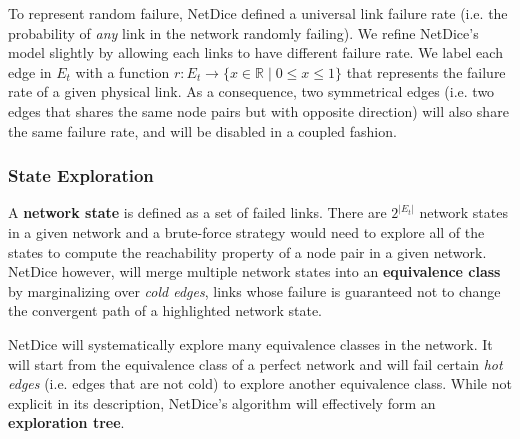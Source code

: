 \documentclass[10pt,sigconf,letterpaper,anonymous,nonacm]{acmart}
\begin{document}
To represent random failure, NetDice defined a universal link failure rate (i.e. 
the probability of \textit{any} link in the network randomly failing).
We refine NetDice's model slightly by allowing each links to have different failure rate.
We label each edge in $E_t$ with a function $r: E_t \rightarrow \{x \in \mathbb{R} \mid 0 \le x 
\le 1\}$ that represents the failure rate of a given physical link.
As a consequence, two symmetrical edges (i.e. two edges that shares the same node pairs but with 
opposite direction) will also share the same failure rate, and will be disabled in a coupled 
fashion.



\subsubsection{State Exploration}
A \textbf{network state} is defined as a set of failed links.
There are $2^{|E_t|}$ network states in a given network and a brute-force strategy 
would need to explore all of the states to compute the reachability property of a 
node pair in a given network. 
NetDice however, will merge multiple network states into an \textbf{equivalence class}
by marginalizing over \textit{cold edges}, links whose failure is guaranteed not to 
change the convergent path of a highlighted network state.

NetDice will systematically explore many equivalence classes in the network. 
It will start from the equivalence class of a perfect network and will fail certain 
\textit{hot edges} (i.e. edges that are not cold) to explore another equivalence 
class.
While not explicit in its description, NetDice's algorithm will effectively form an 
\textbf{exploration tree}. 
\end{document}
